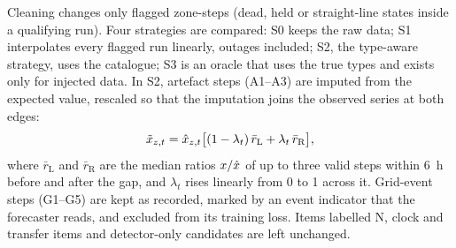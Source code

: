 Cleaning changes only flagged zone-steps (dead, held or straight-line states inside a qualifying run). Four strategies are compared: S0 keeps the raw data; S1 interpolates every flagged run linearly, outages included; S2, the type-aware strategy, uses the catalogue; S3 is an oracle that uses the true types and exists only for injected data. In S2, artefact steps (A1--A3) are imputed from the expected value, rescaled so that the imputation joins the observed series at both edges:
\begin{equation}
\tilde{x}_{z,t} = \hat{x}_{z,t}\big[(1 - \lambda_t)\, \bar{r}_{\mathrm{L}} + \lambda_t\, \bar{r}_{\mathrm{R}}\big],
\label{eq:impute}
\end{equation}
where $\bar{r}_{\mathrm{L}}$ and $\bar{r}_{\mathrm{R}}$ are the median ratios $x/\hat{x}$ of up to three valid steps within 6~h before and after the gap, and $\lambda_t$ rises linearly from 0 to 1 across it. Grid-event steps (G1--G5) are kept as recorded, marked by an event indicator that the forecaster reads, and excluded from its training loss. Items labelled N, clock and transfer items and detector-only candidates are left unchanged.
